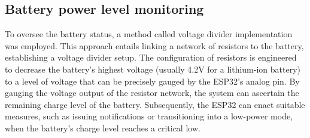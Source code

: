 \documentclass[class=report,11pt,crop=false]{standalone}
\begin{document}
	
	\subsection{Battery power level monitoring}
	To oversee the battery status, a method called voltage divider implementation was employed. This approach entails linking a network of resistors to the battery, establishing a voltage divider setup. The configuration of resistors is engineered to decrease the battery's highest voltage (usually 4.2V for a lithium-ion battery) to a level of voltage that can be precisely gauged by the ESP32's analog pin. By gauging the voltage output of the resistor network, the system can ascertain the remaining charge level of the battery. Subsequently, the ESP32 can enact suitable measures, such as issuing notifications or transitioning into a low-power mode, when the battery's charge level reaches a critical low.
	
\end{document}
